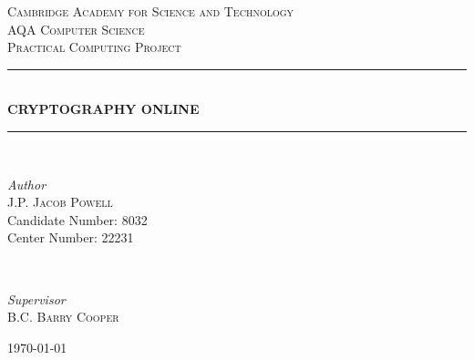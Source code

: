 %
%

\begin{titlepage}

\newcommand{\HRule}{\rule{\linewidth}{0.5mm}}

\center


\textsc{\LARGE Cambridge Academy for Science and Technology}\\[1.5cm]
\textsc{\Large AQA Computer Science}\\[0.5cm]
\textsc{\large Practical Computing Project}\\[0.5cm]


\HRule\\[0.4cm]

{\huge\bfseries \textsc{CRYPTOGRAPHY ONLINE}}\\[0.4cm]

\HRule\\[0.4cm]

\begin{minipage}{0.4\textwidth}
	\begin{flushleft}
		\large
		\textit{Author}\\
		J.P. \textsc{Jacob Powell}\\
		Candidate Number: \textsc{8032} \\
		Center Number: \textsc{22231}
	\end{flushleft}
\end{minipage}
~
\begin{minipage}{0.4\textwidth}
	\begin{flushright}
	\large
	\textit{Supervisor}\\
	B.C. \textsc{Barry Cooper}
	\end{flushright}
\end{minipage}

%
%

\vfill\vfill\vfill %
{\large\today}

%
%

\vfill

\end{titlepage}

